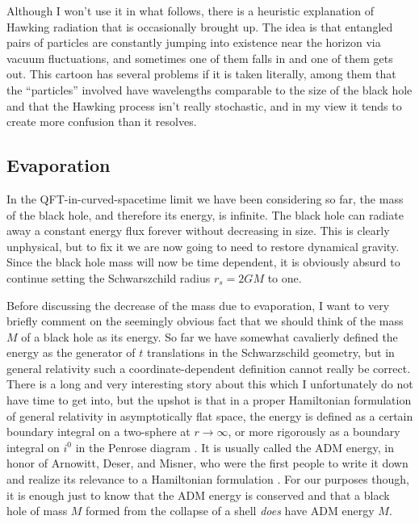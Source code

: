 \documentclass[12pt]{article}
\begin{document}
Although I won't use it in what follows, there is a heuristic explanation of Hawking radiation that is occasionally brought up.  The idea is that entangled pairs of particles are constantly jumping into existence near the horizon via vacuum fluctuations, and sometimes one of them falls in and one of them gets out.  This cartoon has several problems if it is taken literally, among them that the ``particles'' involved have wavelengths comparable to the size of the black hole and that the Hawking process isn't really stochastic, and in my view it tends to create more confusion than it resolves.  

\subsection{Evaporation}\label{tevap}
In the QFT-in-curved-spacetime limit we have been considering so far, the mass of the black hole, and therefore its energy, is infinite.  The black hole can radiate away a constant energy flux forever without decreasing in size.  This is clearly unphysical, but to fix it we are now going to need to restore dynamical gravity.  Since the black hole mass will now be time dependent, it is obviously absurd to continue setting the Schwarszchild radius $r_s=2GM$ to one.  

Before discussing the decrease of the mass due to evaporation, I want to very briefly comment on the seemingly obvious fact that we should think of the mass $M$ of a black hole as its energy.  So far we have somewhat cavalierly defined the energy as the generator of $t$ translations in the Schwarzschild geometry, but in general relativity such a coordinate-dependent definition cannot really be correct.  There is a long and very interesting story about this which I unfortunately do not have time to get into, but the upshot is that in a proper Hamiltonian formulation of general relativity in asymptotically flat space, the energy is defined as a certain boundary integral on a two-sphere at $r\to\infty$, or more rigorously as a boundary integral on $i^0$ in the Penrose diagram \cite{Regge:1974zd}.  It is usually called the ADM energy, in honor of Arnowitt, Deser, and Misner, who were the first people to write it down and realize its relevance to a Hamiltonian formulation \cite{Arnowitt:1962hi}.  For our purposes though, it is enough just to know that the ADM energy is conserved and that a black hole of mass $M$ formed from the collapse of a shell \textit{does} have ADM energy $M$. 
\end{document}
